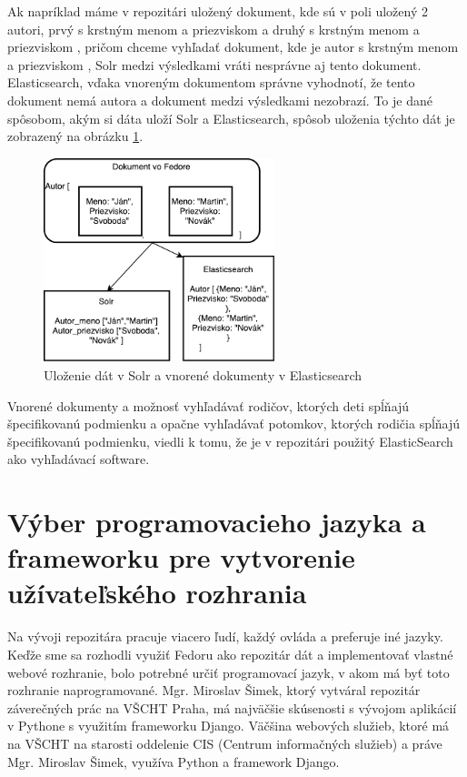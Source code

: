 \documentclass[thesis=M,slovak]{FITthesis}[2013/05/06]
\begin{document}
Ak napríklad máme v repozitári uložený dokument, kde sú v poli  uložený 2 autori, prvý s krstným menom  a priezviskom  a druhý s krstným menom  a priezviskom , pričom chceme vyhľadať dokument, kde je autor s krstným menom  a priezviskom , Solr medzi výsledkami vráti nesprávne aj tento dokument. Elasticsearch, vďaka vnoreným dokumentom správne vyhodnotí, že tento dokument nemá autora  a dokument medzi výsledkami nezobrazí. To je dané spôsobom, akým si dáta uloží Solr a Elasticsearch, spôsob uloženia týchto dát je zobrazený na obrázku \ref{graphics:solr_vs_elastic}.

\begin{figure}\centering
	\includegraphics[width=0.6\textwidth]{diagramy/Solr_vs_Elasticsearch.pdf}
 	\caption[Uloženie dát v Solr a vnorené dokumenty v Elasticsearch]{Uloženie dát v Solr a vnorené dokumenty v Elasticsearch}\label{graphics:solr_vs_elastic}
\end{figure}

Vnorené dokumenty a možnosť vyhľadávať rodičov, ktorých deti spĺňajú špecifikovanú podmienku a opačne vyhľadávať potomkov, ktorých rodičia spĺňajú špecifikovanú podmienku, viedli k tomu, že je v repozitári použitý ElasticSearch ako vyhľadávací software.

\section{Výber programovacieho jazyka a frameworku pre vytvorenie užívateľského rozhrania}
Na vývoji repozitára pracuje viacero ľudí, každý ovláda a preferuje iné jazyky. Keďže sme sa rozhodli využiť Fedoru ako repozitár dát a implementovať vlastné webové rozhranie, bolo potrebné určiť programovací jazyk, v akom má byť toto rozhranie naprogramované. Mgr. Miroslav Šimek, ktorý vytváral repozitár záverečných prác na VŠCHT Praha, má najväčšie skúsenosti s vývojom aplikácií v Pythone s využitím frameworku Django. Väčšina webových služieb, ktoré má na VŠCHT na starosti oddelenie CIS (Centrum informačných služieb) a práve Mgr. Miroslav Šimek, využíva Python a framework Django.
\end{document}
